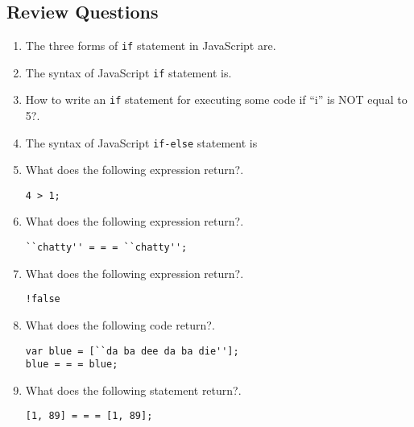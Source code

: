 \documentclass[11pt,a4paper]{article}
\begin{document}
\section*{}
\subsection*{Review Questions}
\begin{enumerate}\itemsep10pt
\item The three forms of \texttt{if} statement in JavaScript are\underline{\hspace{3cm}}.
\item The syntax of JavaScript \texttt{if} statement is\underline{\hspace{3cm}}.
\item How to write an \texttt{if} statement for executing some code if ``i'' is NOT equal to 5?\underline{\hspace{3cm}}.
\item The syntax of JavaScript \texttt{if-else} statement is\underline{\hspace{3cm}}
\item What does the following expression return?\underline{\hspace{3cm}}.
\begin{lstlisting}
4 > 1;
\end{lstlisting}
\item What does the following expression return?\underline{\hspace{3cm}}.
\begin{lstlisting}
``chatty'' = = = ``chatty'';
\end{lstlisting} 
\item What does the following expression return?\underline{\hspace{3cm}}.
\begin{lstlisting}
!false
\end{lstlisting}
\item What does the following code return?\underline{\hspace{3cm}}.
\begin{lstlisting}
var blue = [``da ba dee da ba die''];
blue = = = blue;
\end{lstlisting}
\item What does the following statement return?\underline{\hspace{3cm}}.
\begin{lstlisting}
[1, 89] = = = [1, 89];
\end{lstlisting}

\end{enumerate}
\end{document}
